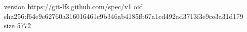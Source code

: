 version https://git-lfs.github.com/spec/v1
oid sha256:f64e9e62760a316016461c9b346ab4185fb67a1cd492ad3713f3e9ce3a31d179
size 5772
